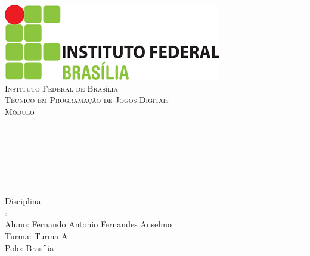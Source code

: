 \title{\rttitulo}
\author{Fernando Antonio Fernandes Anselmo} 
\date{Junho de 2019}

\begin{titlepage}
	\centering
	\vspace*{0.5 cm}
	\includegraphics[scale = 0.65]{imagens/logo.png}\\[1.0 cm]
	\textsc{\Large Instituto Federal de Brasília}\\[2.0 cm]
	\textsc{\Large Técnico em Programação de Jogos Digitais \\ Módulo \rtmodulo}
	\rule{\linewidth}{0.2 mm} \\[0.4 cm]
	{ \huge \bfseries \rttitulo}\\
	\rule{\linewidth}{0.2 mm} \\[1.5 cm]
	\begin{minipage}{1.0\textwidth}
		Disciplina: \rtdisciplina \\  
		\rttituloprof: \rtprofessor \\
		Aluno: Fernando Antonio Fernandes Anselmo \\
		Turma: Turma A \\
		Polo: Brasília
	\end{minipage}\\[2 cm] 
\end{titlepage}

